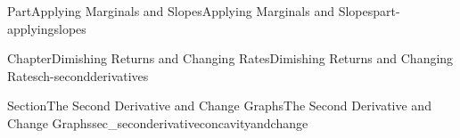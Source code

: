 \documentclass[oneside,10pt,]{tufte-book}
\numberwithin{equation}{chapter}
\def \tikzhistogram (#1,#2){\draw[fill=blue,opacity=0.3] ({#1+((\xtwo-\xmin)/5)},#2) rectangle ({#1-((\xtwo-\xmin)/5)},0); \draw[draw,thick] ({#1+((\xtwo-\xmin)/5)},#2) rectangle ({#1-((\xtwo-\xmin)/5)},0); \node[draw,fill=blue, circle,inner sep=2.5pt] at (#1,#2) {};}
\begin{document}
\begin{partptx}{Part}{Applying Marginals and Slopes}{}{Applying Marginals and Slopes}{}{}{part-applyingslopes}
\begin{chapterptx}{Chapter}{Dimishing Returns and Changing Rates}{}{Dimishing Returns and Changing Rates}{}{}{ch-secondderivatives}
\begin{sectionptx}{Section}{The Second Derivative and Change Graphs}{}{The Second Derivative and Change Graphs}{}{}{sec_seconderivativeconcavityandchange}
\begin{image}{0}{1}{0}{}
{\begin{tikzpicture}[xscale=\xscale,yscale=\yscale]
		
	
	
\end{tikzpicture}
%
\quad
%
}
\end{image}
\end{sectionptx}
\end{chapterptx}
\end{partptx}
\end{document}
